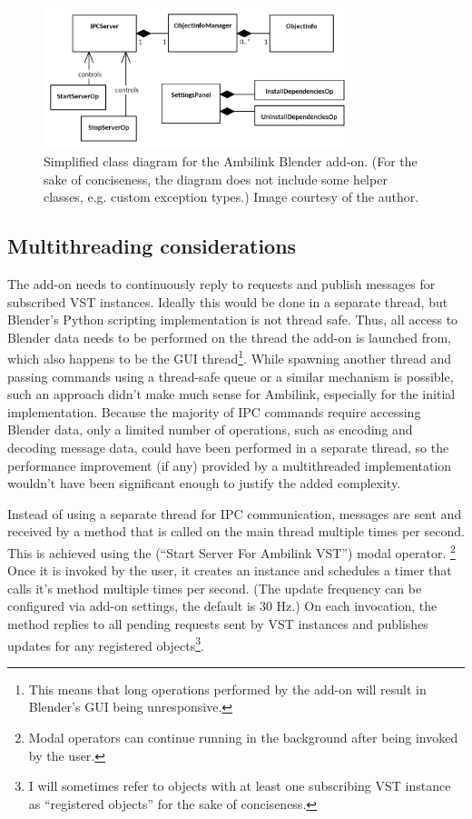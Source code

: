 \begin{figure}%
    \includegraphics[width=0.8\textwidth]{images/implementation/blender_add_on_class_diagram.png}
    \centering
    \caption{Simplified class diagram for the Ambilink Blender add-on. (For the sake of conciseness, the diagram does not include some helper classes, e.g. custom exception types.)
             Image courtesy of the author. \label{fig:blender_addon_class_diagram}}
\end{figure}

\subsection{Multithreading considerations}

The add-on needs to continuously reply to requests and publish messages for subscribed VST instances. 
Ideally this would be done in a separate thread, but Blender's Python scripting implementation is not thread safe.
Thus, all access to Blender data needs to be performed on the thread the add-on is launched from, which also happens to be 
the GUI thread\footnote{This means that long operations performed by the add-on will result in Blender's GUI being unresponsive.}.
While spawning another thread and passing commands using a thread-safe queue or a similar mechanism is possible, 
such an approach didn't make much sense for Ambilink, especially for the initial implementation. 
Because the majority of IPC commands require accessing Blender data, only a limited number of operations, such as encoding and decoding message data,
could have been performed in a separate thread, so the performance improvement (if any) 
provided by a multithreaded implementation wouldn't have been significant enough to justify the added complexity.

Instead of using a separate thread for IPC communication, messages are sent and received by a method that is called 
on the main thread multiple times per second. This is achieved using the  (``Start Server For Ambilink VST'') modal operator.
\footnote{Modal operators can continue running in the background after being invoked by the user.}
Once it is invoked by the user, it creates an  instance and schedules a timer that calls it's  method multiple times per second.
(The update frequency can be configured via add-on settings, the default is 30 Hz.)
On each invocation, the  method replies to all pending requests sent by VST instances and publishes updates for any registered
objects\footnote{I will sometimes refer to objects with at least one subscribing VST instance as ``registered objects'' for the sake of conciseness.}.

